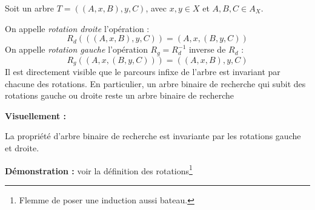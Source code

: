 \documentclass[../../../main.tex]{subfiles}
\begin{document}
 {
	Soit un arbre $T = ((A, x, B), y, C)$, avec $x,y \in X$ et $A, B, C\in A_X$.\newline

	On appelle \textit{rotation droite} l'opération :
	$$R_d(((A, x, B), y, C)) = (A, x, (B, y, C))$$
	On appelle \textit{rotation gauche} l'opération $R_g = R_d^{-1}$ inverse de $R_d$ :
	$$R_g((A, x, (B, y, C))) = ((A, x, B), y, C)$$
	Il est directement visible que le parcours infixe de l'arbre est invariant par chacune des rotations. En particulier, un arbre binaire de recherche qui subit des rotations gauche ou droite reste un arbre binaire de recherche
}
\textbf{Visuellement :} \begin{center}
		
	\end{center}
 La propriété d'arbre binaire de recherche est invariante par les rotations gauche et droite.

\textbf{Démonstration :} voir la définition des rotations\footnote{Flemme de poser une induction aussi bateau.}
\end{document}
